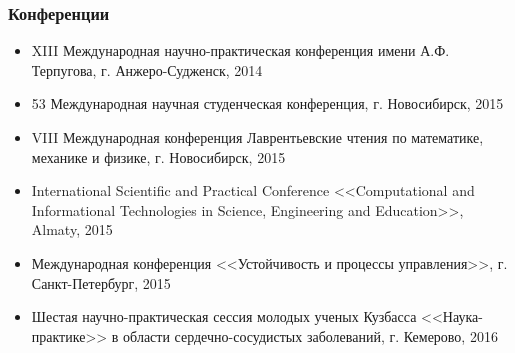 \documentclass[14pt]{beamer}
\begin{document}
\begin{frame}
\frametitle{Конференции}
    {\tiny
        \begin{itemize}
            \item[\MVRightarrow] XIII Международная научно-практическая конференция имени А.Ф. Терпугова, г. Анжеро-Судженск, 2014
            \item[\MVRightarrow] 53 Международная научная студенческая конференция, г. Новосибирск, 2015 
            \item[\MVRightarrow] VIII Международная конференция Лаврентьевские чтения по математике, механике и физике, г. Новосибирск, 2015
            \item[\MVRightarrow] International Scientific and Practical Conference <<Computational and Informational Technologies in Science, Engineering and Education>>, Almaty, 2015
            \item[\MVRightarrow] Международная конференция <<Устойчивость и процессы управления>>, г. Санкт-Петербург, 2015
            \item[\MVRightarrow] Шестая научно-практическая сессия молодых ученых Кузбасса <<Наука-практике>> в области сердечно-сосудистых заболеваний, г. Кемерово, 2016
        \end{itemize}
    }
\end{frame}
\end{document}
